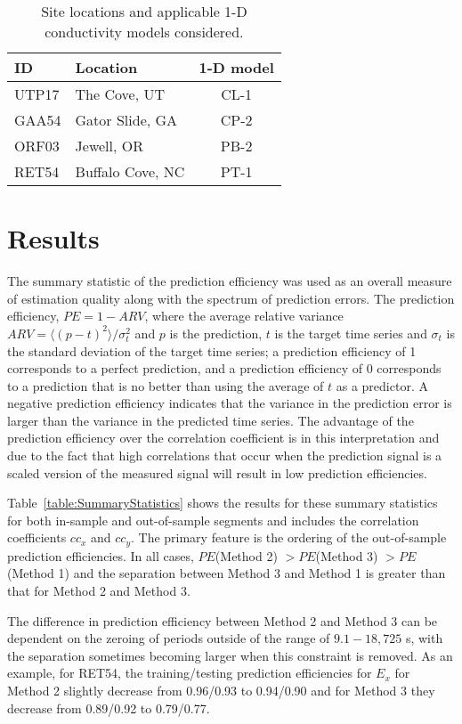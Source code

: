 \documentclass[linenumbers,draft]{agujournal}
\begin{document}
\begin{table}
\centering
\begin{tabular}{ l | l | c }
  ID    & Location & 1-D model \\
  \hline
  UTP17 & The Cove, UT & CL-1 \\
  GAA54 & Gator Slide, GA & CP-2 \\
  ORF03 & Jewell, OR & PB-2 \\
  RET54 & Buffalo Cove, NC & PT-1
\end{tabular}
\caption{Site locations and applicable 1-D conductivity models considered.}
\label{table:SiteLocations}
\end{table}

\section{Results}

The summary statistic of the prediction efficiency was used as an overall measure of estimation quality along with the spectrum of prediction errors.  The prediction efficiency, $PE = 1-ARV$, where the average relative variance $ARV = \langle(p-t)^2\rangle/\sigma_{t}^2$ and $p$ is the prediction, $t$ is the target time series and $\sigma_{t}$ is the standard deviation of the target time series; a prediction efficiency of 1 corresponds to a perfect prediction, and a prediction efficiency of 0 corresponds to a prediction that is no better than using the average of $t$ as a predictor. A negative prediction efficiency indicates that the variance in the prediction error is larger than the variance in the predicted time series. The advantage of the prediction efficiency over the correlation coefficient is in this interpretation and due to the fact that high correlations that occur when the prediction signal is a scaled version of the measured signal will result in low prediction efficiencies.

Table~\ref{table:SummaryStatistics} shows the results for these summary statistics for both in-sample and out-of-sample segments and includes the correlation coefficients $cc_x$ and $cc_y$. The primary feature is the ordering of the out-of-sample prediction efficiencies.  In all cases, 
$PE$(Method 2) $> PE$(Method 3) $> PE$(Method 1) and the separation between Method 3 and Method 1 is greater than that for Method 2 and Method 3. 

The difference in prediction efficiency between Method 2 and Method 3 can be dependent on the zeroing of periods outside of the range of $9.1-18,725$ s, with the separation sometimes becoming larger when this constraint is removed.  As an example, for RET54, the training/testing prediction efficiencies for $E_x$ for Method 2 slightly decrease from 0.96/0.93 to 0.94/0.90 and for Method 3 they decrease from 0.89/0.92 to 0.79/0.77. 
\end{document}
